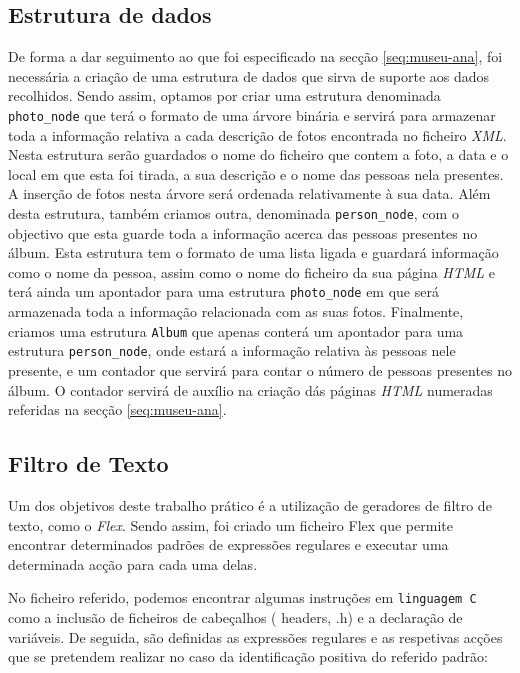 \subsection{Estrutura de dados}
\label{seq:museu-est}
De forma a dar seguimento ao que foi especificado na secção \ref{seq:museu-ana}, foi necessária a criação de uma estrutura de dados que sirva de suporte aos dados recolhidos. Sendo assim, optamos por criar uma estrutura denominada \verb!photo_node! que terá o formato de uma árvore binária e servirá para armazenar toda a informação relativa a cada descrição de fotos encontrada no ficheiro \emph{XML}. Nesta estrutura serão guardados o nome do ficheiro que contem a foto, a data e o local em que esta foi tirada, a sua descrição e o nome das pessoas nela presentes. A inserção de fotos nesta árvore será ordenada relativamente à sua data.
Além desta estrutura, também criamos outra, denominada \verb!person_node!, com o objectivo que esta guarde toda a informação acerca das pessoas presentes no álbum. Esta estrutura tem o formato de uma lista ligada e guardará informação como o nome da pessoa, assim como o nome do ficheiro da sua página \emph{HTML} e terá ainda um apontador para uma estrutura \verb!photo_node! em que será armazenada toda a informação relacionada com as suas fotos. Finalmente, criamos uma estrutura \verb!Album! que apenas conterá um apontador para uma estrutura \verb!person_node!, onde estará a informação relativa às pessoas nele presente, e um contador que servirá para contar o número de pessoas presentes no álbum. O contador servirá de auxílio na criação dás páginas \emph{HTML} numeradas referidas na secção \ref{seq:museu-ana}.

\subsection{Filtro de Texto}
\label{seq:museu-filtro}
Um dos objetivos deste trabalho prático é a utilização de geradores de filtro de texto, como o \emph{Flex}. Sendo assim, foi criado um ficheiro Flex que permite encontrar determinados padrões de expressões regulares e executar uma determinada acção para cada uma delas.

No ficheiro referido, podemos encontrar algumas instruções em \verb!linguagem C! como a inclusão de ficheiros de cabeçalhos ( headers, .h) e a declaração de variáveis.
De seguida, são definidas as expressões regulares e as respetivas acções que se pretendem realizar no caso da identificação positiva do referido padrão:

